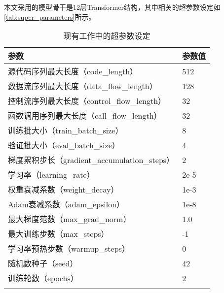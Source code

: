 本文采用的模型骨干是12层Transformer结构，其中相关的超参数设定如\autoref{tab:super_parameters}所示。
\begin{table}[htbp]
    \caption{\label{tab:super_parameters}现有工作中的超参数设定}
    \small
    \renewcommand{\arraystretch}{1.5}
    \begin{tabularx}{\linewidth}{p{8cm}<{\centering}X<{\centering}}
        \Xhline{2\arrayrulewidth}
        参数                            & 参数值  \\ \hline
        源代码序列最大长度（code\_length）                  & 512  \\
        数据流序列最大长度（data\_flow\_length）            & 128   \\
        控制流序列最大长度（control\_flow\_length）            & 32   \\
        函数调用序列最大长度（call\_flow\_length）            & 32   \\
        训练批大小（train\_batch\_size）            & 8    \\
        验证批大小（eval\_batch\_size）             & 4    \\
        梯度累积步长（gradient\_accumulation\_steps） & 2    \\
        学习率（learning\_rate）                & 2e-5 \\
        权重衰减系数（weight\_decay）                 & 1e-3  \\
        Adam衰减系数（adam\_epsilon）                 & 1e-8 \\
        最大梯度范数（max\_grad\_norm）               & 1.0  \\
        最大训练步数（max\_steps）                    & -1   \\
        学习率预热步数（warmup\_steps）                 & 0    \\
        随机数种子（seed）                          & 42   \\
        训练轮数（epochs）                        & 2    \\ \Xhline{2\arrayrulewidth}
        \end{tabularx}
\end{table}



